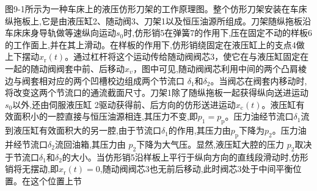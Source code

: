 图9-1所示为一种车床上的液压仿形刀架的工作原理图。整个仿形刀架安装在车床纵拖板上,它是由液压缸2、随动阀3、刀架1以及恒压油源所组成。刀架随纵拖板沿车床床身导轨做等速纵向运动$s_\text{0}$时,仿形销5在弹簧7的作用下,压在固定不动的样板6的工作面上,并在其上滑动。在样板的作用下,仿形销绕固定在液压缸上的支点4做上下摆动$x_\text{r}(t)$。通过杠杆将这个运动传给随动阀阀芯3，使它在与液压缸固定在一起的随动阀阀套中前、后移动$x_\upsilon$，图中可见,随动阀阀芯利用中间的两个凸肩棱边与阀套相对应的两个凹槽校边组成两个节流口 $\delta_\text{1}$和$\delta_\text{2}$。当阀芯在阀套内移动时,将改变这两个节流口的通流截面尺寸。刀架1除了随纵拖板一起获得纵向送进运动$s_\text{0}$以外,还由伺服液压缸 2驱动获得前、后方向的仿形送进运动$x_\text{c}(t)$。液压缸有效面积小的一腔直接与恒压油源相连,其压力不变,即$p_\text{1}=p_\text{p}$。压力油经节流口$\delta_\text{1}$流到液压缸有效面积大的另一腔,由于节流口$\delta_\text{1}$的作用,其压力由$p_\text{p}$下降为$p_\text{2}$。压力油并经节流口$\delta_\text{2}$流回油箱,其压力由 $p_\text{2}$下降为大气压。显然,液压缸大腔的压力 $p_\text{2}$取决于节流口$\delta_\text{1}$和$\delta_\text{2}$的大小。当仿形销5沿样板上平行于纵向方向的直线段滑动时,仿形销将无摆动,即$x_\text{r}(t)=0$,随动阀阀芯3也无前后移动,此时阀芯3处于中间平衡位置。在这个位置上节
